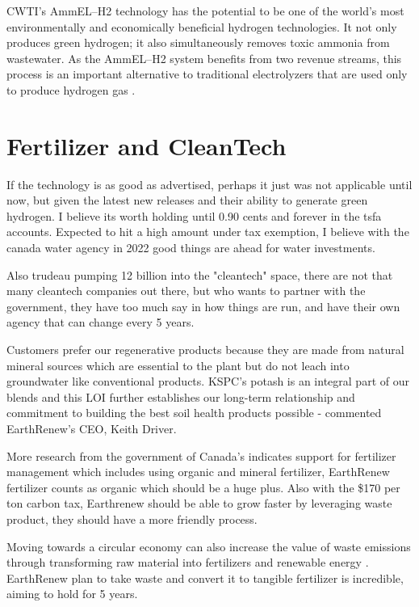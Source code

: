 \begin{blockquote}
CWTI’s AmmEL–H2 technology has the potential to be one of the world’s most environmentally and economically beneficial hydrogen technologies. It not only produces green hydrogen; it also simultaneously removes toxic ammonia from wastewater. As the AmmEL–H2 system benefits from two revenue streams, this process is an important alternative to traditional electrolyzers that are used only to produce hydrogen gas \cite{ctwi_green_hydrogen}.
\end{blockquote}

\section{Fertilizer and CleanTech}

If the technology is as good as advertised, perhaps it just was not applicable until now, but given the latest new releases and their ability to generate green hydrogen. I believe its worth holding until 0.90 cents and forever in the tsfa accounts. Expected to hit a high amount under tax exemption, I believe with the canada water agency in 2022 good things are ahead for water investments.

Also trudeau pumping 12 billion into the "cleantech" space, there are not that many cleantech companies out there, but who wants to partner with the government, they have too much say in how things are run, and have their own agency that can change every 5 years.


 \begin{displayquote}
Customers prefer our regenerative products because they are made from natural mineral sources which are essential to the plant but do not leach into groundwater like conventional products. KSPC’s potash is an integral part of our blends and this LOI further establishes our long-term relationship and commitment to building the best soil health products possible - commented EarthRenew’s CEO, Keith Driver.
    \end{displayquote}
    
    
More research from the government of Canada's \cite{climate_change_2030_emissions} indicates support for fertilizer management which includes using organic and mineral fertilizer, EarthRenew fertilizer counts as organic which should be a huge plus. Also with the \$170 per ton carbon tax, Earthrenew should be able to grow faster by leveraging waste product, they should have a more friendly process.


\begin{blockquote}
Moving towards a circular economy can also increase the value of waste emissions through transforming raw material into fertilizers and renewable energy \cite{climate_change_2030_emissions}. EarthRenew plan to take waste and convert it to tangible fertilizer is incredible, aiming to hold for 5 years.
\end{blockquote}

